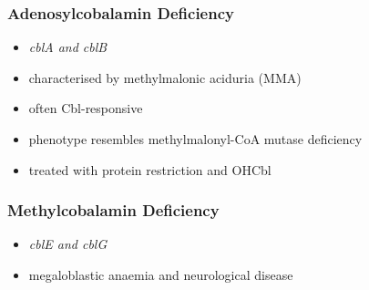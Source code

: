 \documentclass{scrartcl}
\begin{document}
\subsubsection{Adenosylcobalamin Deficiency}
\label{sec:org06d0d7e}
\begin{itemize}
\item \emph{cblA and cblB}
\item characterised by methylmalonic aciduria (MMA)
\item often Cbl-responsive
\item phenotype resembles methylmalonyl-CoA mutase deficiency
\item treated with protein restriction and OHCbl
\end{itemize}

\subsubsection{Methylcobalamin Deficiency}
\label{sec:org5cb3b97}
\begin{itemize}
\item \emph{cblE and cblG}
\item megaloblastic anaemia and neurological disease
\end{itemize}
\end{document}
